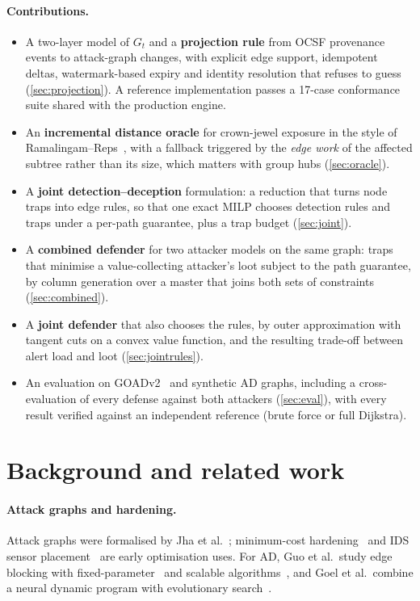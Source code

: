 \documentclass[10pt,twocolumn]{article}
\newcommand{\Gt}{G_t}
\begin{document}
\paragraph{Contributions.}
\begin{itemize}
\item A two-layer model of $\Gt$ and a \textbf{projection rule} from OCSF provenance
events to attack-graph changes, with explicit edge support, idempotent deltas,
watermark-based expiry and identity resolution that refuses to guess
(\cref{sec:projection}). A reference implementation passes a 17-case conformance
suite shared with the production engine.
\item An \textbf{incremental distance oracle} for crown-jewel exposure in the style of
Ramalingam--Reps~\cite{ramalingam1996incremental}, with a fallback triggered by the
\emph{edge work} of the affected subtree rather than its size, which matters with group
hubs (\cref{sec:oracle}).
\item A \textbf{joint detection--deception} formulation: a reduction that turns node
traps into edge rules, so that one exact MILP chooses detection rules and traps under a
per-path guarantee, plus a trap budget (\cref{sec:joint}).
\item A \textbf{combined defender} for two attacker models on the same graph: traps that
minimise a value-collecting attacker's loot subject to the path guarantee, by column
generation over a master that joins both sets of constraints (\cref{sec:combined}).
\item A \textbf{joint defender} that also chooses the rules, by outer approximation with tangent
cuts on a convex value function, and the resulting trade-off between alert load and loot
(\cref{sec:jointrules}).
\item An evaluation on GOADv2~\cite{goad,bhsample} and synthetic AD graphs, including a
cross-evaluation of every defense against both attackers (\cref{sec:eval}), with every
result verified against an independent reference (brute force or full Dijkstra).
\end{itemize}

\section{Background and related work}\label{sec:related}

\paragraph{Attack graphs and hardening.} Attack graphs were formalised by Jha et
al.~\cite{jha2002two}; minimum-cost hardening~\cite{wang2006hardening} and IDS sensor
placement~\cite{noel2008sensor} are early optimisation uses. For AD, Guo et al.\ study
edge blocking with fixed-parameter~\cite{guo2022practical} and scalable
algorithms~\cite{guo2023scalable}, and Goel et al.\ combine a neural dynamic program
with evolutionary search~\cite{goel2022defending}.
\end{document}
